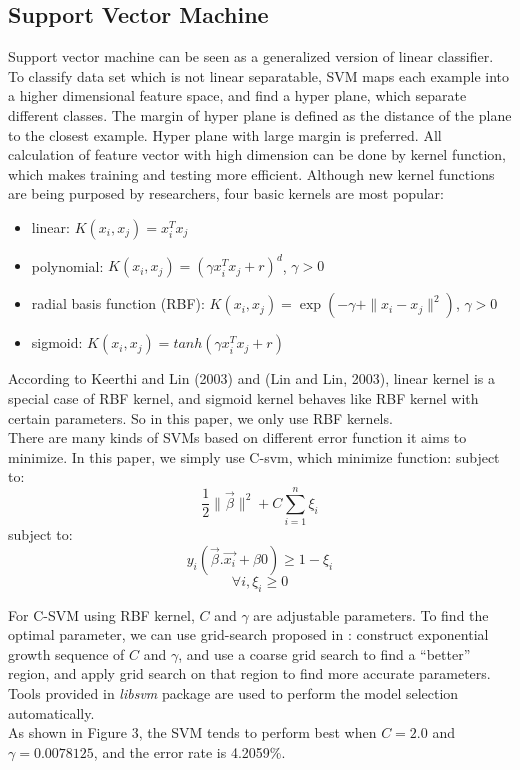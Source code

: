 \documentclass[a4paper,11pt]{article}
\begin{document}
\subsection{Support Vector Machine}
Support vector machine can be seen as a generalized version of linear classifier. To classify data set which is not linear separatable, SVM maps each example into a higher dimensional feature space, and find a hyper plane, which separate different classes. The margin of hyper plane is defined as the distance of the plane to the closest example. Hyper plane with large margin is preferred. All calculation of feature vector with high dimension can be done by kernel function, which makes training and testing more efficient. Although new kernel functions are being purposed by researchers, four basic kernels are most popular:\cite{SVM}
\begin{itemize}
\item linear: $K(x_i,x_j)=x_i^Tx_j$\\
\item polynomial: $K(x_i,x_j)=(\gamma x_i^Tx_j+r)^d$, $\gamma >0$\\
\item radial basis function (RBF): $K(x_i,x_j)=\exp(-\gamma + \|x_i-x_j\|^2)$, $\gamma > 0$\\
\item sigmoid: $K(x_i,x_j)=tanh(\gamma x_i^Tx_j+r)$\\
\end{itemize}
According to Keerthi and Lin (2003) and (Lin and Lin, 2003), linear kernel is a special case of RBF kernel, and sigmoid kernel behaves like RBF kernel with certain parameters. So in this paper, we only use RBF kernels.\\
There are many kinds of SVMs based on different error function it aims to minimize. In this paper, we simply use C-svm, which minimize function:
 subject to:$$\frac{1}{2}\|\vec{\beta}\|^2+C\sum_{i=1}^n \xi_i$$
 subject to:$$y_i(\vec{\beta}.\vec{x_i}+\beta{0})\geq 1-\xi_i$$$$\forall i, \xi_i\geq 0$$

For C-SVM using RBF kernel, $C$ and $\gamma$ are adjustable parameters. To find the optimal parameter, we can use grid-search proposed in \cite{SVM}: construct exponential growth sequence of $C$ and $\gamma$, and use a coarse grid search to find a ``better'' region, and apply grid search on that region to find more accurate parameters. Tools provided in \emph{libsvm} package are used to perform the model selection automatically.\\
As shown in Figure 3, the SVM tends to perform best when $C=2.0$ and $\gamma=0.0078125$, and the error rate is 4.2059\%.
\end{document}
